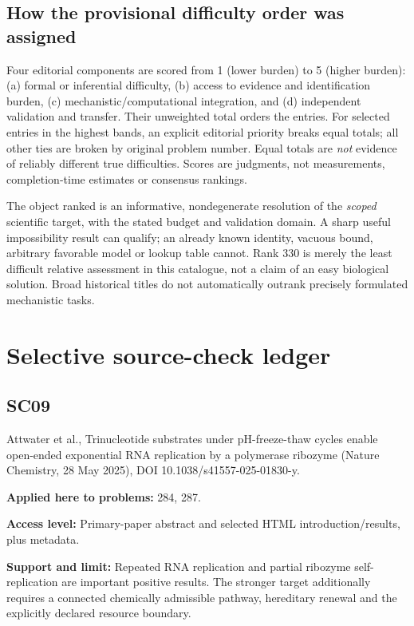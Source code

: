 \documentclass[11pt]{article}
\begin{document}
\subsection*{How the provisional difficulty order was assigned}
Four editorial components are scored from 1 (lower burden) to 5 (higher burden): (a) formal or inferential difficulty, (b) access to evidence and identification burden, (c) mechanistic/computational integration, and (d) independent validation and transfer. Their unweighted total orders the entries. For selected entries in the highest bands, an explicit editorial priority breaks equal totals; all other ties are broken by original problem number. Equal totals are \emph{not} evidence of reliably different true difficulties. Scores are judgments, not measurements, completion-time estimates or consensus rankings.

The object ranked is an informative, nondegenerate resolution of the \emph{scoped} scientific target, with the stated budget and validation domain. A sharp useful impossibility result can qualify; an already known identity, vacuous bound, arbitrary favorable model or lookup table cannot. Rank 330 is merely the least difficult relative assessment in this catalogue, not a claim of an easy biological solution. Broad historical titles do not automatically outrank precisely formulated mechanistic tasks.


\section*{Selective source-check ledger}
\subsection*{SC09}\label{check:SC09}

Attwater et al., Trinucleotide substrates under pH-freeze-thaw cycles enable open-ended exponential RNA replication by a polymerase ribozyme (Nature Chemistry, 28 May 2025), DOI 10.1038/s41557-025-01830-y.

\textbf{Applied here to problems:} 284, 287.

\textbf{Access level:} Primary-paper abstract and selected HTML introduction/results, plus metadata.

\textbf{Support and limit:} Repeated RNA replication and partial ribozyme self-replication are important positive results. The stronger target additionally requires a connected chemically admissible pathway, hereditary renewal and the explicitly declared resource boundary.
\end{document}

